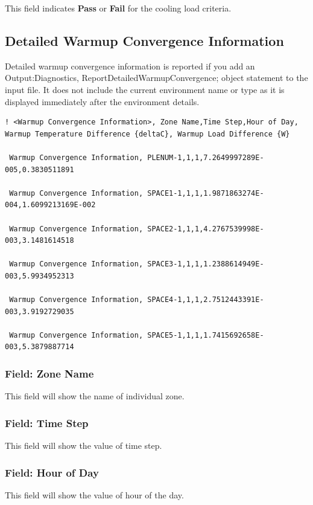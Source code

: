 This field indicates \textbf{Pass} or \textbf{Fail} for the cooling load criteria.

\subsection{Detailed Warmup Convergence Information}

Detailed warmup convergence information is reported if you add an Output:Diagnostics, ReportDetailedWarmupConvergence; object statement to the input file. It does not include the current environment name or type as it is displayed immediately after the environment details.

\begin{lstlisting}
! <Warmup Convergence Information>, Zone Name,Time Step,Hour of Day, Warmup Temperature Difference {deltaC}, Warmup Load Difference {W}

 Warmup Convergence Information, PLENUM-1,1,1,7.2649997289E-005,0.3830511891

 Warmup Convergence Information, SPACE1-1,1,1,1.9871863274E-004,1.6099213169E-002

 Warmup Convergence Information, SPACE2-1,1,1,4.2767539998E-003,3.1481614518

 Warmup Convergence Information, SPACE3-1,1,1,1.2388614949E-003,5.9934952313

 Warmup Convergence Information, SPACE4-1,1,1,2.7512443391E-003,3.9192729035

 Warmup Convergence Information, SPACE5-1,1,1,1.7415692658E-003,5.3879887714
\end{lstlisting}

\subsubsection{Field: Zone Name}

This field will show the name of individual zone.

\subsubsection{Field: Time Step}

This field will show the value of time step.

\subsubsection{Field: Hour of Day}

This field will show the value of hour of the day.

